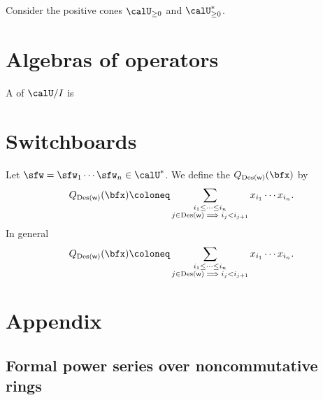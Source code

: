 \documentclass{article}
\newcommand*\Des{\operatorname{Des}}
\begin{document}
Consider the positive cones $\calU_{\geq 0}$ and $\calU^\ast_{\geq 0}$.


\section{Algebras of operators}

\begin{definition}
    A  of $\calU/I$ is
\end{definition}

\section{Switchboards}

\begin{definition}
    Let $\sfw = \sfw_1\cdots\sfw_n \in \calU^\ast$.
    We define the  $Q_{\Des(\sf w)}(\bfx)$ by
    \[
        Q_{\Des(\sf w)}(\bfx)
        \coloneq
        \sum_{
            \substack{
                i_1 \leq \cdots \leq i_n \\
                j \in \Des({\sf w}) \implies i_j < i_{j+1}
            }
        }
        x_{i_1} \cdots x_{i_n}.
    \]
    In general
    \[
        Q_{\Des(\sf w)}(\bfx)
        \coloneq
        \sum_{
            \substack{
                i_1 \leq \cdots \leq i_n \\
                j \in \Des({\sf w}) \implies i_j < i_{j+1}
            }
        }
        x_{i_1} \cdots x_{i_n}.
    \]
\end{definition}


\section{Appendix}

\subsection{Formal power series over noncommutative rings}
\end{document}
